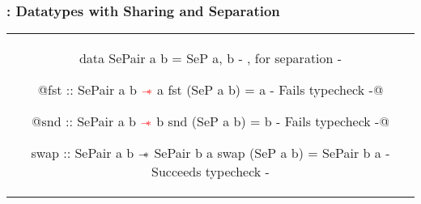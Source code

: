 \begin{frame}[fragile, c]
  \frametitle{\qub{}: Datatypes with Sharing and Separation}
  \begin{center}
       \begin{tabular}[c]{c}
          \begin{haskell}
data SePair a b = SeP a, b     {- , for separation -}

@fst :: SePair a b ${\color{red}\mathrel{-\mkern-6mu*}}$ a
fst (SeP a b) = a              {- Fails typecheck -}@

@snd :: SePair a b ${\color{red}\mathrel{-\mkern-6mu*}}$ b
snd (SeP a b) = b              {- Fails typecheck -}@

swap :: SePair a b $\mathrel{-\mkern-6mu*}$ SePair b a
swap (SeP a b) = SePair b a    {- Succeeds typecheck -}
          \end{haskell}
        \end{tabular}
  \end{center}
\end{frame}

